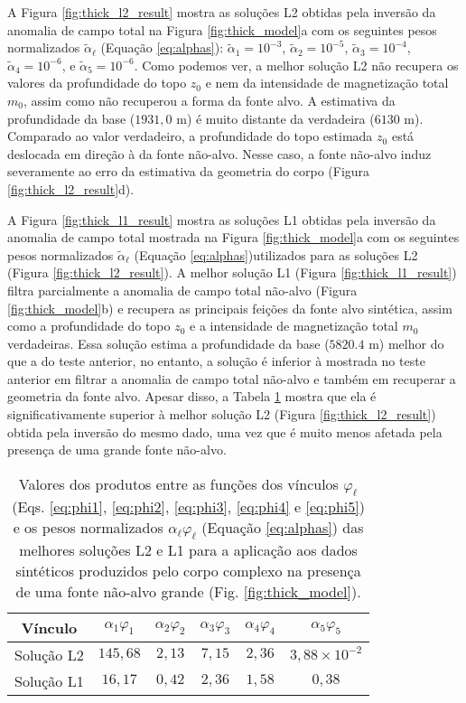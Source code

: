 A Figura \ref{fig:thick_l2_result} mostra as soluções L2 obtidas pela inversão da anomalia de campo total na Figura \ref{fig:thick_model}a
com os seguintes pesos normalizados $\tilde{\alpha}_{\ell}$ (Equação \ref{eq:alphas}):
$\tilde{\alpha}_{1} = 10^{-3}$, $\tilde{\alpha}_{2} = 10^{-5}$, 
$\tilde{\alpha}_{3} = 10^{-4}$, $\tilde{\alpha}_{4} = 10^{-6}$, e 
$\tilde{\alpha}_{5} = 10^{-6}$.
Como podemos ver, a melhor solução L2 não recupera os valores da profundidade do topo $z_{0}$ e nem da intensidade de magnetização total $m_{0}$, assim como não recuperou a forma da fonte alvo.
A estimativa da profundidade da base ($1931,0$ m) é muito distante da verdadeira ($6130$ m).
Comparado ao valor verdadeiro, a profundidade do topo estimada $z_{0}$ está deslocada em direção à da fonte não-alvo.
Nesse caso, a fonte não-alvo induz severamente ao erro da estimativa da geometria do corpo (Figura \ref{fig:thick_l2_result}d).

A Figura \ref{fig:thick_l1_result} mostra as soluções L1 obtidas pela inversão da anomalia de campo total mostrada na Figura \ref{fig:thick_model}a
com os seguintes pesos normalizados $\tilde{\alpha}_{\ell}$ (Equação \ref{eq:alphas})utilizados para as soluções L2 (Figura \ref{fig:thick_l2_result}).
A melhor solução L1 (Figura \ref{fig:thick_l1_result}) filtra parcialmente a anomalia de campo total não-alvo (Figura \ref{fig:thick_model}b) e recupera as principais feições da fonte alvo sintética, assim como a profundidade do topo $z_{0}$ e a intensidade de magnetização total $m_{0}$ verdadeiras.
Essa solução estima a profundidade da base ($5820.4$ m) melhor do que a do teste anterior, no entanto, a solução é inferior à mostrada no teste anterior em filtrar a anomalia de campo total não-alvo e também em recuperar a geometria da fonte alvo.
Apesar disso, a Tabela \ref{tab:thick} mostra que ela é significativamente superior à melhor solução L2 (Figura \ref{fig:thick_l2_result}) obtida pela inversão do mesmo dado, uma vez que é muito menos afetada pela presença de uma grande fonte não-alvo.

\begin{table}[h]\label{tab:thick}
	\caption{Valores dos produtos entre as funções dos vínculos $ \varphi_{\ell} $ (Eqs. \ref{eq:phi1}, \ref{eq:phi2}, \ref{eq:phi3}, \ref{eq:phi4} e \ref{eq:phi5}) e os pesos normalizados $ \alpha_\ell \varphi_\ell  $ (Equação \ref{eq:alphas}) das melhores soluções L2 e L1 para a aplicação aos dados sintéticos produzidos pelo corpo complexo na presença de uma fonte não-alvo grande (Fig. \ref{fig:thick_model}).}
		\centering
		\vspace{0.5cm}
		\begin{tabular}{c|ccccc}
			Vínculo & $ \alpha_{1}\varphi _1 $ & $ \alpha_{2}\varphi _2 $ &  $ \alpha_{3}\varphi _3 $ &  $ \alpha_{4}\varphi _4 $ &  $ \alpha_{5}\varphi _5 $ \\
		\hline
		Solução L2 & $ 145,68 $ & $ 2,13 $ & $ 7,15 $ & $ 2,36 $ & $3,88 \times 10^{-2} $ \\ 
		Solução L1 & $ 16,17 $ & $ 0,42 $ & $ 2,36 $ & $ 1,58 $ & $ 0,38 $
	\end{tabular}
\end{table}

